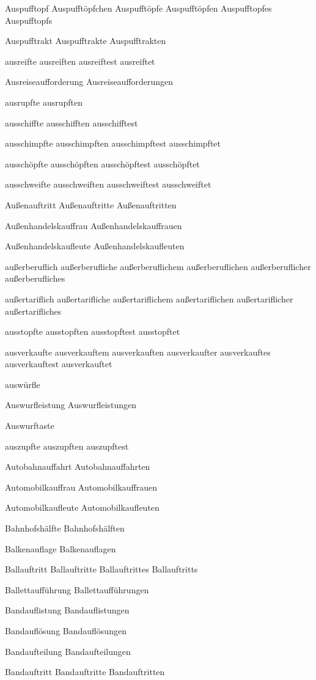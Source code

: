 Auspufftopf
Auspufftöpfchen
Auspufftöpfe
Auspufftöpfen
Auspufftopfes
Auspufftopfs

Auspufftrakt
Auspufftrakte
Auspufftrakten

ausreifte
ausreiften
ausreiftest
ausreiftet

Ausreiseaufforderung
Ausreiseaufforderungen

ausrupfte
ausrupften

ausschiffte
ausschifften
ausschifftest

ausschimpfte
ausschimpften
ausschimpftest
ausschimpftet

ausschöpfte
ausschöpften
ausschöpftest
ausschöpftet

ausschweifte
ausschweiften
ausschweiftest
ausschweiftet

Außenauftritt
Außenauftritte
Außenauftritten

Außenhandelskauffrau
Außenhandelskauffrauen

Außenhandelskaufleute
Außenhandelskaufleuten

außerberuflich
außerberufliche
außerberuflichem
außerberuflichen
außerberuflicher
außerberufliches

außertariflich
außertarifliche
außertariflichem
außertariflichen
außertariflicher
außertarifliches

ausstopfte
ausstopften
ausstopftest
ausstopftet

ausverkaufte
ausverkauftem
ausverkauften
ausverkaufter
ausverkauftes
ausverkauftest
ausverkauftet

auswürfle

Auswurfleistung
Auswurfleistungen

Auswurftaste

auszupfte
auszupften
auszupftest

Autobahnauffahrt
Autobahnauffahrten

Automobilkauffrau
Automobilkauffrauen

Automobilkaufleute
Automobilkaufleuten

Bahnhofshälfte
Bahnhofshälften

Balkenauflage
Balkenauflagen

Ballauftritt
Ballauftritte
Ballauftrittes
Ballauftritts

Ballettaufführung
Ballettaufführungen

Bandauflistung
Bandauflistungen

Bandauflösung
Bandauflösungen

Bandaufteilung
Bandaufteilungen

Bandauftritt
Bandauftritte
Bandauftritten


